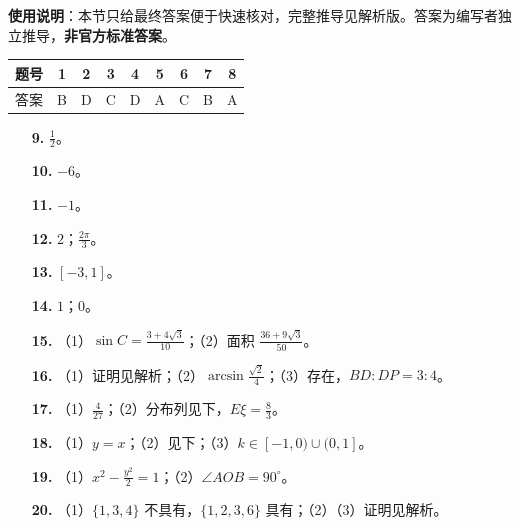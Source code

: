 
\begin{gknotice}
\textbf{使用说明}：本节只给最终答案便于快速核对，完整推导见解析版。答案为编写者独立推导，\textbf{非官方标准答案}。
\end{gknotice}

\begin{center}\begin{tabular}{ccccccccc}
\toprule
题号 & 1 & 2 & 3 & 4 & 5 & 6 & 7 & 8 \\
\midrule
答案 & B & D & C & D & A & C & B & A \\
\bottomrule
\end{tabular}\end{center}

\begin{itemize}[leftmargin=2.6em]
  \item[\textbf{9.}] $\frac12$。
  \item[\textbf{10.}] $-6$。
  \item[\textbf{11.}] $-1$。
  \item[\textbf{12.}] $2$；$\frac{2\pi}{3}$。
  \item[\textbf{13.}] $[-3,1]$。
  \item[\textbf{14.}] $1$；$0$。
\end{itemize}

\begin{itemize}[leftmargin=2.6em]
  \item[\textbf{15.}] （1）$\sin C=\frac{3+4\sqrt3}{10}$；（2）面积 $\frac{36+9\sqrt3}{50}$。
  \item[\textbf{16.}] （1）证明见解析；（2）$\arcsin\frac{\sqrt2}{4}$；（3）存在，$BD:DP=3:4$。
  \item[\textbf{17.}] （1）$\frac4{27}$；（2）分布列见下，$E\xi=\frac83$。
  \item[\textbf{18.}] （1）$y=x$；（2）见下；（3）$k\in[-1,0)\cup(0,1]$。
  \item[\textbf{19.}] （1）$x^2-\frac{y^2}{2}=1$；（2）$\angle AOB=90^\circ$。
  \item[\textbf{20.}] （1）$\{1,3,4\}$ 不具有，$\{1,2,3,6\}$ 具有；（2）（3）证明见解析。
\end{itemize}
